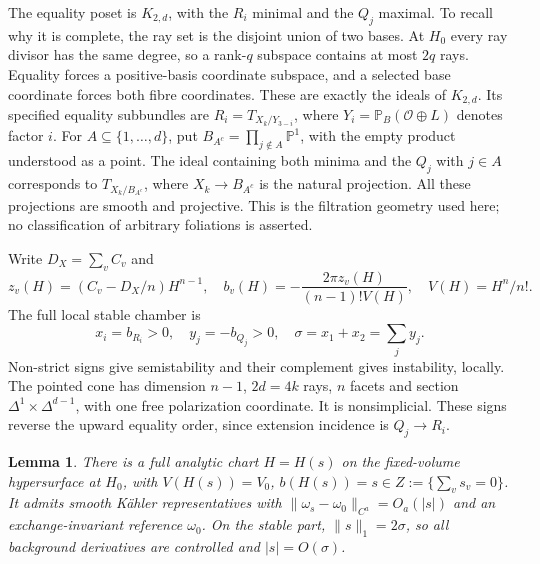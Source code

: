 \documentclass[11pt]{amsart}
\newtheorem{lemma}[theorem]{Lemma}
\theoremstyle{definition}
\theoremstyle{remark}
\newcommand{\PP}{\mathbb P}
\newcommand{\cO}{\mathcal O}
\begin{document}
The equality poset is \(K_{2,d}\), with the \(R_i\) minimal and
the \(Q_j\) maximal. To recall why it is complete, the ray set is
the disjoint union of two bases. At \(H_0\) every ray divisor has
the same degree, so a rank-\(q\) subspace contains at most \(2q\)
rays. Equality forces a positive-basis coordinate subspace, and a
selected base coordinate forces both fibre coordinates. These are
exactly the ideals of \(K_{2,d}\). Its specified equality subbundles
are \(R_i=T_{X_k/Y_{3-i}}\), where
\(Y_i=\PP_B(\cO\oplus L)\) denotes factor \(i\).
For \(A\subseteq\{1,\ldots,d\}\), put
\(B_{A^c}=\prod_{j\notin A}\PP^1\), with the empty product
understood as a point. The ideal containing both minima and the
\(Q_j\) with \(j\in A\) corresponds to \(T_{X_k/B_{A^c}}\),
where \(X_k\to B_{A^c}\) is the natural projection.
All these projections are smooth and projective.
This is the filtration geometry used here; no classification of
arbitrary foliations is asserted.

Write \(D_X=\sum_vC_v\) and
\begin{equation}\label{eq09:signs}
 z_v(H)=(C_v-D_X/n)H^{n-1},\quad
 b_v(H)=-\frac{2\pi z_v(H)}{(n-1)!V(H)},\quad V(H)=H^n/n!.
\end{equation}
The full local stable chamber is
\begin{equation}\label{eq09:chamber}
 x_i=b_{R_i}>0,\quad y_j=-b_{Q_j}>0,\quad
 \sigma=x_1+x_2=\sum_jy_j.
\end{equation}
Non-strict signs give semistability and their complement gives
instability, locally. The pointed cone has dimension \(n-1\),
\(2d=4k\) rays, \(n\) facets and section
\(\Delta^1\times\Delta^{d-1}\), with one free polarization
coordinate. It is nonsimplicial. These signs reverse the upward
equality order, since extension incidence is \(Q_j\to R_i\).

\begin{lemma}\label{lem09:chart}
There is a full analytic chart \(H=H(s)\) on the fixed-volume
hypersurface at \(H_0\), with
\(V(H(s))=V_0\), \(b(H(s))=s\in Z:=\{\sum_vs_v=0\}\).
It admits smooth Kähler representatives with
\(\|\omega_s-\omega_0\|_{C^a}=O_a(|s|)\) and an
exchange-invariant reference \(\omega_0\). On the stable part,
\(\|s\|_1=2\sigma\), so all background derivatives are controlled
and \(|s|=O(\sigma)\).
\end{lemma}
\end{document}
